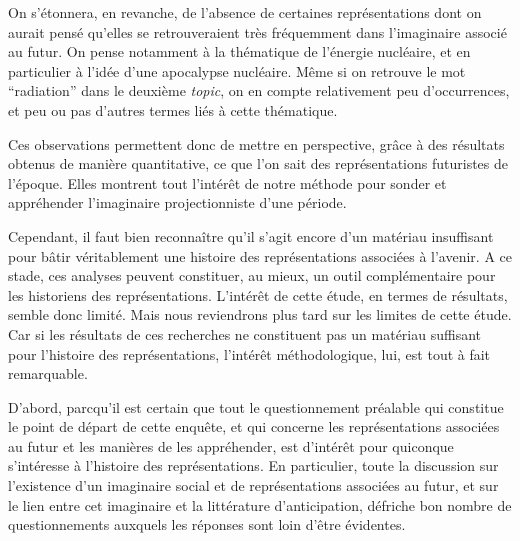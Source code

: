 \documentclass[letterpaper,portrait,12pt]{article}
\begin{document}
\textcolor[rgb]{0.000,0.000,0.000}{	On s'\'{e}tonnera, en revanche, de l'absence de certaines repr\'{e}sentations dont on aurait pens\'{e} qu'elles se retrouveraient tr\`{e}s fr\'{e}quemment dans l'imaginaire associ\'{e} au futur. On pense notamment \`{a} la th\'{e}matique de l'\'{e}nergie nucl\'{e}aire, et en particulier \`{a} l'id\'{e}e d'une apocalypse nucl\'{e}aire. M\^{e}me si on retrouve le mot {``}radiation'' dans le deuxi\`{e}me }\emph{\textcolor[rgb]{0.000,0.000,0.000}{topic}}\textcolor[rgb]{0.000,0.000,0.000}{, on en compte relativement peu d'occurrences, et peu ou pas d'autres termes li\'{e}s \`{a} cette th\'{e}matique. }





\textcolor[rgb]{0.000,0.000,0.000}{	Ces observations permettent donc de mettre en perspective, gr\^{a}ce \`{a} des r\'{e}sultats obtenus de mani\`{e}re quantitative, ce que l'on sait des repr\'{e}sentations futuristes de l'\'{e}poque. Elles montrent tout l'int\'{e}r\^{e}t de notre m\'{e}thode pour sonder et appr\'{e}hender l'imaginaire projectionniste d'une p\'{e}riode.}





\textcolor[rgb]{0.000,0.000,0.000}{	Cependant, il faut bien reconna\^{i}tre qu'il s'agit encore d'un mat\'{e}riau insuffisant pour b\^{a}tir v\'{e}ritablement une histoire des repr\'{e}sentations associ\'{e}es \`{a} l'avenir. A ce stade, ces analyses peuvent constituer, au mieux, un outil compl\'{e}mentaire pour les historiens des repr\'{e}sentations. L'int\'{e}r\^{e}t de cette \'{e}tude, en termes de r\'{e}sultats, semble donc limit\'{e}. Mais nous reviendrons plus tard sur les limites de cette \'{e}tude. Car si les r\'{e}sultats de ces recherches ne constituent pas un mat\'{e}riau suffisant pour l'histoire des repr\'{e}sentations, l'int\'{e}r\^{e}t m\'{e}thodologique, lui, est tout \`{a} fait remarquable.}





\textcolor[rgb]{0.000,0.000,0.000}{	D'abord, parcqu'il est certain que tout le questionnement pr\'{e}alable qui constitue le point de d\'{e}part de cette enqu\^{e}te, et qui concerne les repr\'{e}sentations associ\'{e}es au futur et les mani\`{e}res de les appr\'{e}hender, est d'int\'{e}r\^{e}t pour quiconque s'int\'{e}resse \`{a} l'histoire des repr\'{e}sentations. En particulier, toute la discussion sur l'existence d'un imaginaire social et de repr\'{e}sentations associ\'{e}es au futur, et sur le lien entre cet imaginaire et la litt\'{e}rature d'anticipation, d\'{e}friche bon nombre de questionnements auxquels les r\'{e}ponses sont loin d'\^{e}tre \'{e}videntes.}
\end{document}
